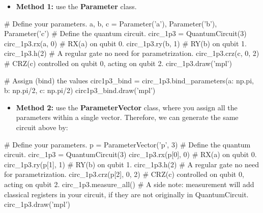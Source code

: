 \documentclass[%
oneside,                 %
final,                   %
10pt]{article}
\begin{document}
\epycod


\begin{itemize}
\item \textbf{Method 1:} use the \textbf{Parameter} class. 
\end{itemize}

\noindent










\bpycod
# Define your parameters.
a, b, c = Parameter('a'), Parameter('b'), Parameter('c')
# Define the quantum circuit.
circ_1p3 = QuantumCircuit(3)
circ_1p3.rx(a, 0)         # RX(a) on qubit 0.
circ_1p3.ry(b, 1)         # RY(b) on qubit 1.
circ_1p3.h(2)             # A regular gate no need for parametrization.
circ_1p3.crz(c, 0, 2)     # CRZ(c) controlled on qubit 0, acting on qubit 2.
circ_1p3.draw('mpl')

\epycod






\bpycod
# Assign (bind) the values
circ1p3_bind = circ_1p3.bind_parameters({a: np.pi, b: np.pi/2, c: np.pi/2})
circ1p3_bind.draw('mpl')

\epycod


\begin{itemize}
\item \textbf{Method 2:} use the \textbf{ParameterVector} class, where you assign all the parameters within a single vector. Therefore, we can generate the same circuit above by:
\end{itemize}

\noindent











\bpycod
# Define your parameters.
p = ParameterVector('p', 3)  
# Define the quantum circuit.
circ_1p3 = QuantumCircuit(3)
circ_1p3.rx(p[0], 0)         # RX(a) on qubit 0.
circ_1p3.ry(p[1], 1)         # RY(b) on qubit 1.
circ_1p3.h(2)                # A regular gate no need for parametrization.
circ_1p3.crz(p[2], 0, 2)     # CRZ(c) controlled on qubit 0, acting on qubit 2.
circ_1p3.measure_all()       # A side note: measurement will add classical registers in your circuit, if they are not originally in QuantumCircuit. 
circ_1p3.draw('mpl')

\epycod
\end{document}
